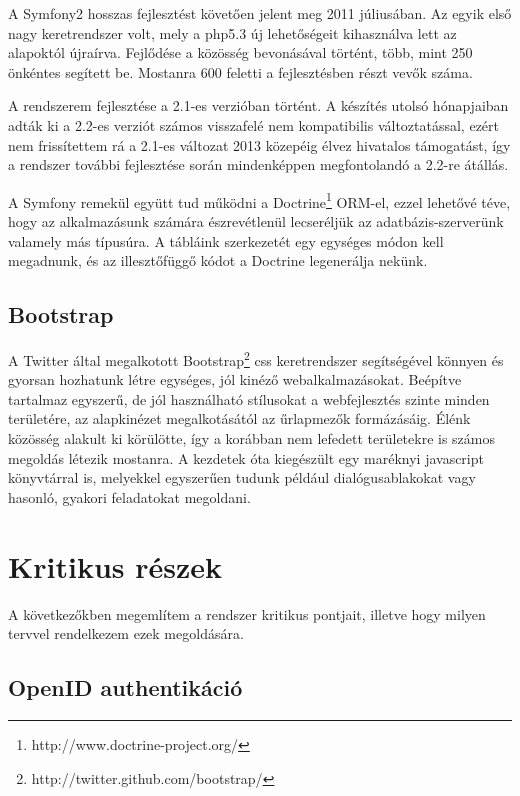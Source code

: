 \documentclass[a4paper,12pt,oneside]{report}
\begin{document}
A Symfony2 hosszas fejlesztést követően jelent meg 2011 júliusában. Az egyik első nagy keretrendszer volt, mely a php5.3 új lehetőségeit kihasználva lett az alapoktól újraírva. Fejlődése a közösség bevonásával történt, több, mint 250 önkéntes segített be. Mostanra 600 feletti a fejlesztésben részt vevők száma.

A rendszerem fejlesztése a 2.1-es verzióban történt. A készítés utolsó hónapjaiban adták ki a 2.2-es verziót számos visszafelé nem kompatibilis változtatással, ezért nem frissítettem rá \textendash{} a 2.1-es változat 2013 közepéig élvez hivatalos támogatást, így a rendszer további fejlesztése során mindenképpen megfontolandó a 2.2-re átállás.

A Symfony remekül együtt tud működni a Doctrine\footnote{http://www.doctrine-project.org/} ORM-el, ezzel lehetővé téve, hogy az alkalmazásunk számára észrevétlenül lecseréljük az adatbázis-szerverünk valamely más típusúra. A tábláink szerkezetét egy egységes módon kell megadnunk, és az illesztőfüggő kódot a Doctrine legenerálja nekünk.

\subsection{Bootstrap}

A Twitter által megalkotott Bootstrap\footnote{http://twitter.github.com/bootstrap/} css keretrendszer segítségével könnyen és gyorsan hozhatunk létre egységes, jól kinéző webalkalmazásokat. Beépítve tartalmaz egyszerű, de jól használható stílusokat a webfejlesztés szinte minden területére, az alapkinézet megalkotásától az űrlapmezők formázásáig. Élénk közösség alakult ki körülötte, így a korábban nem lefedett területekre is számos megoldás létezik mostanra. A kezdetek óta kiegészült egy maréknyi javascript könyvtárral is, melyekkel egyszerűen tudunk például dialógusablakokat vagy hasonló, gyakori feladatokat megoldani.

\section{Kritikus részek}

A következőkben megemlítem a rendszer kritikus pontjait, illetve hogy milyen tervvel rendelkezem ezek megoldására.

\subsection{OpenID authentikáció}
\end{document}
